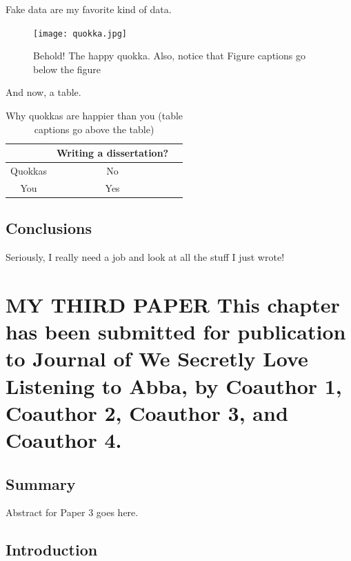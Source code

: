 \documentclass[english]{ucdenver-dissertation}
\makeatletter
\let\SF@@footnote\footnote
\def\footnote{\ifx\protect\@typeset@protect
    \expandafter\SF@@footnote
  \else
    \expandafter\SF@gobble@opt
  \fi
}
\edef\SF@gobble@opt{\noexpand\protect
  \expandafter\noexpand\csname SF@gobble@opt \endcsname}
\providecommand{\tabularnewline}{\\}
\makeatother
\begin{document}
Fake data are my favorite kind of data.

\begin{figure}
\begin{centering}
\texttt{[image: quokka.jpg]}
\par\end{centering}

\caption{Behold! The happy quokka.  Also, notice that Figure captions go below the figure}
\end{figure}

And now, a table.

\begin{table}[H]
\caption{Why quokkas are happier than you (table captions go above the table)}
\begin{centering}
\begin{tabular}{ccc}
\hline 
 & Writing a dissertation?\tabularnewline
\hline 
Quokkas & No\tabularnewline
You & Yes\tabularnewline
\hline 
\end{tabular}
\par\end{centering}

\end{table}

\section{Conclusions}

Seriously, I really need a job and look at all the stuff I just wrote!

\newpage

\chapter{MY THIRD PAPER%
\footnote{This chapter has been submitted for publication to Journal of We Secretly Love Listening 
to Abba, by Coauthor 1, Coauthor 2, Coauthor 3, and Coauthor 4.%
}}


\section{Summary}

Abstract for Paper 3 goes here. 

\blindtext


\section{Introduction}
\end{document}
